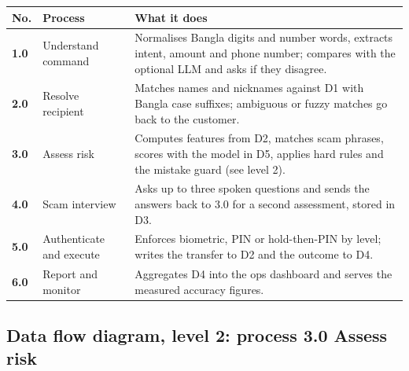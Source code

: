 \begin{tabularx}{\textwidth}{@{}>{\sffamily\bfseries\small}p{10mm} >{\raggedright\arraybackslash}p{36mm} X@{}}
\toprule
\textnormal{\sffamily\small No.} & \sffamily\small Process & \sffamily\small What it does\\
\midrule
1.0 & Understand command & Normalises Bangla digits and number words, extracts intent, amount and phone number; compares with the optional LLM and asks if they disagree.\\
2.0 & Resolve recipient & Matches names and nicknames against D1 with Bangla case suffixes; ambiguous or fuzzy matches go back to the customer.\\
3.0 & Assess risk & Computes features from D2, matches scam phrases, scores with the model in D5, applies hard rules and the mistake guard (see level 2).\\
4.0 & Scam interview & Asks up to three spoken questions and sends the answers back to 3.0 for a second assessment, stored in D3.\\
5.0 & Authenticate and execute & Enforces biometric, PIN or hold-then-PIN by level; writes the transfer to D2 and the outcome to D4.\\
6.0 & Report and monitor & Aggregates D4 into the ops dashboard and serves the measured accuracy figures.\\
\bottomrule
\end{tabularx}

\clearpage
\subsection{Data flow diagram, level 2: process 3.0 Assess risk}

